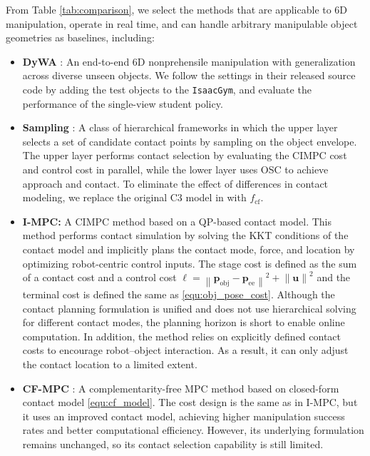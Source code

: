 From Table \ref{tab:comparison}, we select the methods that are applicable to 6D manipulation, operate in real time, and can handle arbitrary manipulable object geometries as baselines, including:
\begin{itemize}
    \item \textbf{DyWA} \cite{lyu2025dywa}:  An end-to-end 6D nonprehensile manipulation with generalization across diverse unseen objects. We follow the settings in their released source code by adding the test objects to the \texttt{IsaacGym}, and evaluate the performance of the single-view student policy. 
    \item \textbf{Sampling} \cite{venkatesh2025approximating}: A class of hierarchical frameworks  in which the upper layer selects a set of candidate contact points by sampling on the object envelope. The upper layer performs contact selection by evaluating the CIMPC cost and control cost in parallel, while the lower layer uses OSC to achieve approach and contact. To eliminate the effect of differences in contact modeling, we replace the original C3 model \cite{aydinoglu2024consensus} in \cite{venkatesh2025approximating} with $f_{\text{cf}}$.
    \item \textbf{I-MPC:} A CIMPC method based on a QP-based contact model. This method performs contact simulation by solving the KKT conditions of the contact model and implicitly plans the contact mode, force, and location by optimizing robot-centric control inputs. The stage cost is defined as the sum of a contact cost and a control cost $\ell = \left \| \boldsymbol{p}_{\text{obj}} - \boldsymbol{p}_{\text{ee}} \right \|^2 +\left \| \boldsymbol{u} \right \|^2$
and the terminal cost is defined the same as \eqref{equ:obj_pose_cost}. Although the contact planning formulation is unified and does not use hierarchical solving for different contact modes, the planning horizon is short to enable online computation. In addition, the method relies on explicitly defined contact costs to encourage robot–object interaction. As a result, it can only adjust the contact location to a  limited extent.
    \item \textbf{CF-MPC} \cite{jin2024complementarity}: A complementarity-free MPC method based on closed-form contact model \eqref{equ:cf_model}. The cost design is the same as in I-MPC, but it uses an improved contact model, achieving higher manipulation success rates and better computational efficiency. However, its underlying formulation remains unchanged, so its contact selection capability is still limited.
\end{itemize}


